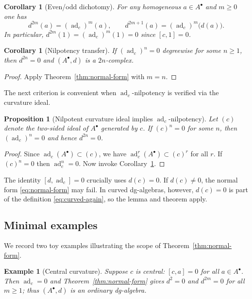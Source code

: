 \documentclass[preprint,12pt]{elsarticle}
\newcommand{\ad}{\operatorname{ad}}
\newtheorem{exmp}[defi]{Example}
\newtheorem{prop}{Proposition}
\newtheorem{cor}[thm]{Corollary}
\begin{document}
\begin{cor}[Even/odd dichotomy]\label{cor:even-odd}
For any homogeneous $a\in A^\bullet$ and $m\ge 0$ one has
\[
d^{2m}(a)=(\ad_c)^m(a),\qquad d^{2m+1}(a)=(\ad_c)^m\big(d(a)\big).
\]
In particular, $d^{2m}(1)=(\ad_c)^m(1)=0$ since $[c,1]=0$.
\end{cor}

\begin{cor}[Nilpotency transfer]\label{cor:nilpotency}
If $(\ad_c)^n=0$ degreewise for some $n\ge 1$, then $d^{2n}=0$ and $(A^\bullet,d)$ is a $2n$-complex.
\end{cor}

\begin{proof}
Apply Theorem~\ref{thm:normal-form} with $m=n$.
\end{proof}

The next criterion is convenient when $\ad_c$-nilpotency is verified via the curvature ideal.

\begin{prop}[Nilpotent curvature ideal implies $\ad_c$-nilpotency]\label{prop:nil-ideal}
Let $(c)$ denote the two-sided ideal of $A^\bullet$ generated by $c$. If $(c)^n=0$ for some $n$, then
$(\ad_c)^n=0$ and hence $d^{2n}=0$.
\end{prop}

\begin{proof}
Since $\ad_c(A^\bullet)\subset (c)$, we have $\ad_c^r(A^\bullet)\subset (c)^r$ for all $r$. If $(c)^n=0$ then $\ad_c^n=0$.
Now invoke Corollary~\ref{cor:nilpotency}.
\end{proof}

\begin{rmk}\label{rem:hypotheses}
The identity $[d,\ad_c]=0$ crucially uses $d(c)=0$. If $d(c)\neq 0$, the normal form \eqref{eq:normal-form} may fail.
In curved dg-algebras, however, $d(c)=0$ is part of the definition \eqref{eq:curved-again}, so the lemma and theorem apply.
\end{rmk}

\subsection{Minimal examples}\label{subsec:examples-iterates}
We record two toy examples illustrating the scope of Theorem~\ref{thm:normal-form}.

\begin{exmp}[Central curvature]\label{exa:central-curvature}
Suppose $c$ is central: $[c,a]=0$ for all $a\in A^\bullet$. Then $\ad_c=0$ and
Theorem~\ref{thm:normal-form} gives $d^{2}=0$ and $d^{2m}=0$ for all $m\ge 1$; thus $(A^\bullet,d)$ is an ordinary dg-algebra.
\end{exmp}
\end{document}
